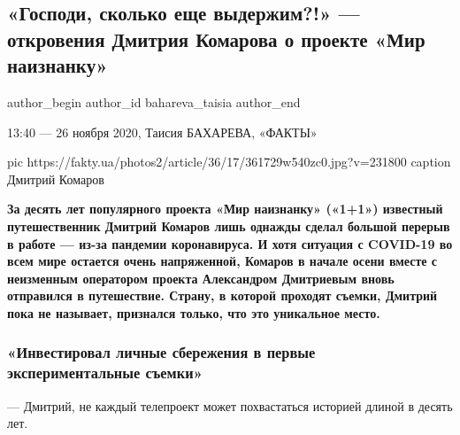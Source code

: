  
 
 
 
 
 
\subsection{«Господи, сколько еще выдержим?!» --- откровения Дмитрия Комарова о проекте «Мир наизнанку»}
\label{sec:26_11_2020.news.ua.fakty.bahareva_taisia.1.komarov}
\ifcmt
	author_begin
   author_id bahareva_taisia
	author_end
\fi

13:40 --- 26 ноября 2020, Таисия БАХАРЕВА, «ФАКТЫ»

\ifcmt
pic https://fakty.ua/photos2/article/36/17/361729w540zc0.jpg?v=231800
caption Дмитрий Комаров
\fi


\begin{leftbar}
	\bfseries
За десять лет популярного проекта «Мир наизнанку» («1+1») \textbf{известный
путешественник Дмитрий Комаров} лишь однажды сделал большой перерыв в работе —
из-за пандемии коронавируса. И хотя ситуация с COVID-19 во всем мире остается
очень напряженной, Комаров в начале осени вместе с неизменным оператором
проекта Александром Дмитриевым вновь отправился в путешествие. Страну, в
которой проходят съемки, Дмитрий пока не называет, признался только, что это
уникальное место.
\end{leftbar}

\subsubsection{«Инвестировал личные сбережения в первые экспериментальные съемки»}

--- Дмитрий, не каждый телепроект может похвастаться историей длиной
в десять лет.

